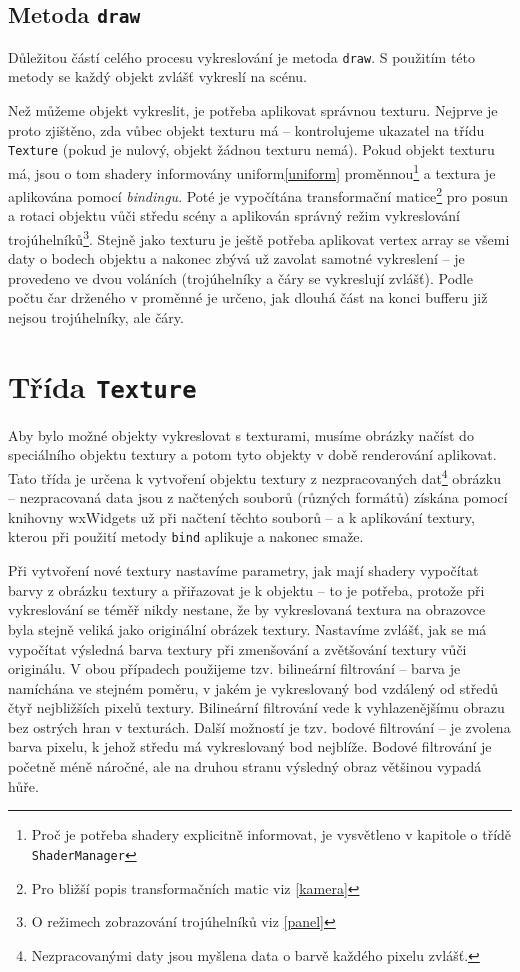 \documentclass[a4paper, 11pt]{report}
\begin{document}
\subsection{Metoda \texttt{draw}}
Důležitou částí celého procesu vykreslování je metoda \texttt{draw}. S použitím této metody se každý objekt zvlášť vykreslí na scénu.

Než můžeme objekt vykreslit, je potřeba aplikovat správnou texturu. Nejprve je proto zjištěno, zda vůbec objekt texturu má -- kontrolujeme ukazatel na třídu \texttt{Texture} (pokud je nulový, objekt žádnou texturu nemá). Pokud objekt texturu má, jsou o tom shadery informovány uniform\cref{uniform} proměnnou\footnote{Proč je potřeba shadery explicitně informovat, je vysvětleno v kapitole o třídě \texttt{ShaderManager}} a textura je aplikována pomocí \emph{bindingu}. Poté je vypočítána transformační matice\footnote{Pro bližší popis transformačních matic viz \ref{kamera}} pro posun a rotaci objektu vůči středu scény a aplikován správný režim vykreslování trojúhelníků\footnote{O režimech zobrazování trojúhelníků viz \ref{panel}}. Stejně jako texturu je ještě potřeba aplikovat vertex array se všemi daty o bodech objektu a nakonec zbývá už zavolat samotné vykreslení -- je provedeno ve dvou voláních (trojúhelníky a čáry se vykreslují zvlášť). Podle počtu čar drženého v proměnné je určeno, jak dlouhá část na konci bufferu již nejsou trojúhelníky, ale čáry.

\section{Třída \texttt{Texture}}
Aby bylo možné objekty vykreslovat s texturami, musíme obrázky načíst do speciálního objektu textury a potom tyto objekty v době renderování aplikovat. Tato třída je určena k vytvoření objektu textury z nezpracovaných dat\footnote{Nezpracovanými daty jsou myšlena data o barvě každého pixelu zvlášť.} obrázku -- nezpracovaná data jsou z načtených souborů (různých formátů) získána pomocí knihovny wxWidgets už při načtení těchto souborů -- a k aplikování textury, kterou při použití metody \texttt{bind} aplikuje a nakonec smaže.

Při vytvoření nové textury nastavíme parametry, jak mají shadery vypočítat barvy z obrázku textury a přiřazovat je k objektu -- to je potřeba, protože při vykreslování se téměř nikdy nestane, že by vykreslovaná textura na obrazovce byla stejně veliká jako originální obrázek textury. Nastavíme zvlášť, jak se má vypočítat výsledná barva textury při zmenšování a zvětšování textury vůči originálu. V obou případech použijeme tzv. bilineární filtrování -- barva je namíchána ve stejném poměru, v jakém je vykreslovaný bod vzdálený od středů čtyř nejbližších pixelů textury. Bilineární filtrování vede k vyhlazenějšímu obrazu bez ostrých hran v texturách. Další možností je tzv. bodové filtrování -- je zvolena barva pixelu, k jehož středu má vykreslovaný bod nejblíže. Bodové filtrování je početně méně náročné, ale na druhou stranu výsledný obraz většinou vypadá hůře.
\end{document}
